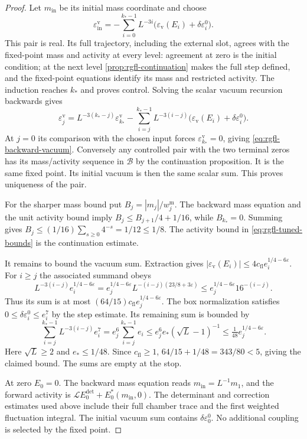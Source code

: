 \begin{proof}
Let $m_{\mathrm{in}}$ be its initial mass coordinate
and choose
\[
 \varepsilon_{\mathrm{in}}^{\mathrm v}
      =-\sum_{i=0}^{k_*-1}L^{-3i}
                     \big(\varepsilon_{\mathrm v}(E_i)
                                           +\delta\varepsilon_i^0\big).
\]
This pair is real. Its full trajectory, including
the external slot, agrees with the fixed-point mass
and activity at every level: agreement at zero is
the initial condition; at the next level
\cref{prop:rgfl-continuation} makes the
full step defined, and the fixed-point equations
identify its mass and restricted activity.
The induction reaches $k_*$ and proves control.
Solving the scalar vacuum recursion backwards gives
\[
 \varepsilon_j^{\mathrm v}
 =L^{-3(k_*-j)}\varepsilon_{k_*}^{\mathrm v}
     -\sum_{i=j}^{k_*-1}L^{-3(i-j)}
                     \big(\varepsilon_{\mathrm v}(E_i)
                                           +\delta\varepsilon_i^0\big).
\]
At $j=0$ its comparison with the chosen input forces
$\varepsilon_{k_*}^{\mathrm v}=0$, giving
\eqref{eq:rgfl-backward-vacuum}.
Conversely any controlled pair with the two terminal
zeros has its mass/activity sequence in $\mathcal B$
by the continuation proposition. It is the same fixed
point. Its initial vacuum is then the same scalar
sum. This proves uniqueness of the pair.

For the sharper mass bound put
$B_j=|m_j|/w_j^{\mathrm m}$.
The backward mass equation and the unit activity
bound imply $B_j\le B_{j+1}/4+1/16$, while
$B_{k_*}=0$.
Summing gives $B_j\le(1/16)\sum_{s\ge0}4^{-s}
=1/12\le1/8$.
The activity bound in \eqref{eq:rgfl-tuned-bounds}
is the continuation estimate.

It remains to bound the vacuum sum.
Extraction gives
$|\varepsilon_{\mathrm v}(E_i)|
\le4c_{\mathrm{fl}}e_i^{1/4-6\varepsilon}$.
For $i\ge j$ the associated summand obeys
\[
 L^{-3(i-j)}e_i^{1/4-6\varepsilon}
       =e_j^{1/4-6\varepsilon}
                         L^{-(i-j)(23/8+3\varepsilon)}
       \le e_j^{1/4-6\varepsilon}16^{-(i-j)}.
\]
Thus its sum is at most
$(64/15)c_{\mathrm{fl}}e_j^{1/4-6\varepsilon}$.
The box normalization satisfies
$0\le\delta\varepsilon_i^0\le e_i^7$ by the
step estimate.
Its remaining sum is bounded by
\[
 \sum_{i=j}^{k_*-1}L^{-3(i-j)}e_i^7
        =e_j^6\sum_{i=j}^{k_*-1}e_i
        \le e_j^6 e_*(\sqrt L-1)^{-1}
        \le\tfrac1{48}e_j^{1/4-6\varepsilon}.
\]
Here $\sqrt L\ge2$ and $e_*\le1/48$.
Since $c_{\mathrm{fl}}\ge1$,
$64/15+1/48=343/80<5$, giving the claimed bound.
The sums are empty at the stop.

At zero $E_0=0$. The backward mass equation reads
$m_{\mathrm{in}}=L^{-1}m_1$, and the forward activity is
$\mathcal LE_0^{\mathrm{det}}+E_0^*(m_{\mathrm{in}},0)$.
The determinant and correction estimates used above
include their full chamber trace and the first
weighted fluctuation integral. The initial vacuum
sum contains $\delta\varepsilon_0^0$.
No additional coupling is selected by the fixed point.
\end{proof}

